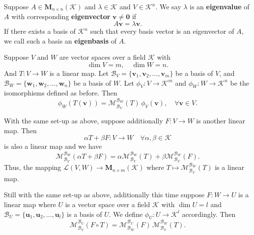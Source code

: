 \documentclass{ctexart}
\begin{document}
	\begin{mydef}\label{def:eigenvalue}
		Suppose $A \in \mathbf{M}_{n\times n}(\mathcal{K})$ and	$\lambda \in \mathcal{K}$ and $V \in \mathcal{K}^n$. We say $\lambda$ is an \textbf{eigenvalue} of $A$ with	corresponding \textbf{eigenvector} $\mathbf{v} \neq \mathbf{0}$ if
		\[
		A\mathbf{v} = \lambda \mathbf{v}.
		\]
		If there exists a basis of $\mathcal{K}^n$ such that every basis vector is an eigenvector of $A$, we call such a basis an \textbf{eigenbasis} of $A$.
	\end{mydef}
	\begin{mythm}
		Suppose $V$ and $W$ are vector spaces over a field $\mathcal{K}$ with
		\[
		\dim V = m, \quad \dim W = n.
		\]
		And $T: V \to W$ is a linear map. Let $\mathcal{B}_V = \{\mathbf{v}_1, \mathbf{v}_2, \dots, \mathbf{v}_m\}$ be a basis of $V$, and $\mathcal{B}_W = \{\mathbf{w}_1, \mathbf{w}_2, \dots, \mathbf{w}_n\}$ be a basis of $W$. Let $\phi_V: V \to \mathcal{K}^m$ and $\phi_W: W \to \mathcal{K}^n$ be the isomorphisms defined as before. Then
		\[
		\phi_W (T(\mathbf{v})) = \mathcal{M}^{\mathcal{B}_W}_{\mathcal{B}_V}(T) \, \phi_V(\mathbf{v}), \quad \forall \mathbf{v} \in V.
		\]
	\end{mythm}
	\begin{mythm}
		With the same set-up as above, suppose additionally $F:V \to W$ is another linear map. Then
		\[
		\alpha T + \beta F: V \to W \quad \forall \alpha, \beta \in \mathcal{K}
		\]
		is also a linear map and we have
		\[
		\mathcal{M}^{\mathcal{B}_W}_{\mathcal{B}_V}(\alpha T + \beta F) = \alpha \mathcal{M}^{\mathcal{B}_W}_{\mathcal{B}_V}(T) + \beta \mathcal{M}^{\mathcal{B}_W}_{\mathcal{B}_V}(F).
		\]
		Thus, the mapping $\mathcal{L}(V,W)\to \mathbf{M}_{n \times m}(\mathcal{K})$ where $T \mapsto \mathcal{M}^{\mathcal{B}_W}_{\mathcal{B}_V}(T)$ is a linear map.
	\end{mythm}
	\begin{mythm}
		Still with the same set-up as above, additionally this time suppose $F:W \to U$ is a linear map where $U$ is a vector space over a field $\mathcal{K}$ with $\dim U = l$ and $\mathcal{B}_U = \{\mathbf{u}_1, \mathbf{u}_2, \dots, \mathbf{u}_l\}$ is a basis of $U$. We define $\phi_U: U \to \mathcal{K}^l$ accordingly. Then
		\[
		\mathcal{M}^{\mathcal{B}_U}_{\mathcal{B}_V}(F \circ T) = \mathcal{M}^{\mathcal{B}_U}_{\mathcal{B}_W}(F) \, \mathcal{M}^{\mathcal{B}_W}_{\mathcal{B}_V}(T).
		\]
	\end{mythm}
\end{document}
